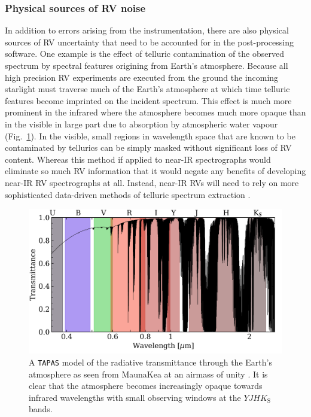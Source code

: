\subsubsection{Physical sources of RV noise}
In addition to errors arising from the instrumentation, there are also physical sources of RV
uncertainty that need to be accounted for in the post-processing software. One example is the effect
of telluric contamination of the observed spectrum by spectral features origining from Earth's
atmosphere. Because all high precision RV experiments are executed from the ground the incoming
starlight must traverse much of the Earth's atmosphere at which time telluric features become
imprinted on the incident spectrum. This effect is much more prominent in the infrared where
the atmosphere becomes much more opaque than in the visible in large part due to absorption by
atmospheric water vapour (Fig.~\ref{fig:transmission}). In the visible, small regions
in wavelength space that are known to be contaminated by tellurics can be simply masked without
significant loss of RV content. Whereas this method if applied to near-IR spectrographs would
eliminate so much RV information that it would negate any benefits of developing near-IR RV
spectrographs at all. Instead, near-IR RVs will need to rely on more sophisticated data-driven
methods of telluric spectrum extraction \citep[e.g.][]{artigau14,bedell19}.

\begin{figure}
  \centering
  \includegraphics[width=\textwidth]{figures/transmittance.png}
  \caption{A \texttt{TAPAS} model of the radiative transmittance through the Earth's atmosphere
    as seen from MaunaKea at an airmass of unity \citep{bertaux14}. It is clear that the atmosphere
    becomes increasingly opaque towards infrared wavelengths with small observing windows at the
    $YJHK_{\text{S}}$ bands.}
  \label{fig:transmission}
\end{figure}


